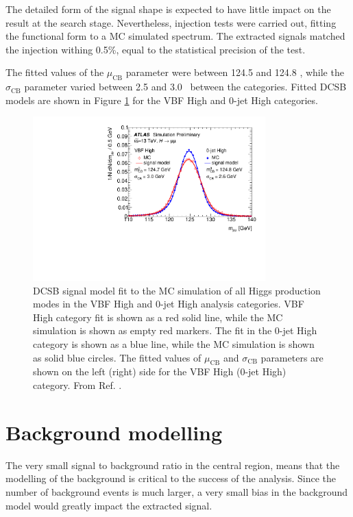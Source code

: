 The detailed form of the signal shape is expected to have little
impact on the result at the search stage. Nevertheless, injection
tests were carried out, fitting the functional form to a MC simulated
spectrum. The extracted signals matched the injection withing 0.5\%,
equal to the statistical precision of the test.

The fitted values of the $\mu_\text{CB}$ parameter were between
124.5 and 124.8 \GeV, while the $\sigma_\text{CB}$ parameter varied
between 2.5 and 3.0 \GeV~between the categories. Fitted DCSB models
are shown in Figure \ref{fig:hmumu:sig-model} for the VBF High and
0-jet High categories.
\begin{figure}[h!]
  \centering
  \includegraphics[width=0.8\textwidth]{figures/hmumu/sig-model}
  \caption[$\hmumu$ signal model]{
  DCSB signal model fit to the MC simulation of all Higgs production
  modes in the VBF High and 0-jet High analysis categories. VBF High
  category fit is shown as a red solid line, while the MC simulation
  is shown as empty red markers. The fit in the 0-jet High category
  is shown as a blue line, while the MC simulation is shown as solid 
  blue circles. The fitted values of $\mu_\text{CB}$ and
  $\sigma_\text{CB}$ parameters are shown on the left (right) side 
  for the VBF High (0-jet High) category. From Ref. \cite{ATLAS-CONF-2019-028}.
  }
  \label{fig:hmumu:sig-model}
\end{figure}


\section{Background modelling}

The very small signal to background ratio in the central region,
means that the modelling of the background is critical to the
success of the analysis. Since the number of background events
is much larger, a very small bias in the background model would
greatly impact the extracted signal.

